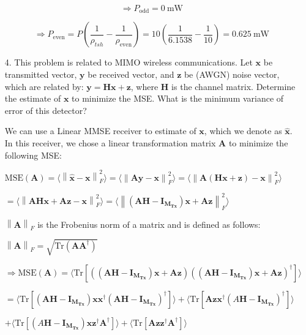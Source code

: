 \documentclass[fleqn]{article}
\newcommand{\norm}[1]{\left \lVert #1 \right \rVert}
\begin{document}
\begin{enumerate}
		\begin{equation*}
			\Rightarrow P_{\text{odd}} = 0\ \text{mW}
		\end{equation*}
		
		\begin{equation*}
			\Rightarrow P_{\text{even}} = P\left(\frac{1}{\rho_{tsh}} - \frac{1}{\rho_{\text{even}}}\right) = 10\left(\frac{1}{6.1538} - \frac{1}{10}\right) = 0.625\ \text{mW}
		\end{equation*}		
		
		\item[4.] This problem is related to MIMO wireless communications. Let $\mathbf{x}$ be transmitted vector, $\mathbf{y}$ be received vector, and $\mathbf{z}$ be (AWGN) noise vector, which are related by: $\mathbf{y}=\mathbf{Hx} + \mathbf{z}$, where $\mathbf{H}$ is the channel matrix. Determine the estimate of $\mathbf{x}$ to minimize the MSE. What is the minimum variance of error of this detector?
		
		\pagebreak
		We can use a Linear MMSE receiver to estimate of $\mathbf{x}$, which we denote as $\mathbf{\hat{x}}$. In this receiver, we chose a linear transformation matrix $\mathbf{A}$ to minimize the following MSE:
		
		$\text{MSE}(\mathbf{A}) = \langle \norm{\mathbf{\hat{x}} - \mathbf{x}}^2_F \rangle = \langle \norm{\mathbf{Ay} - \mathbf{x}}^2_F \rangle = \langle \norm{\mathbf{A}(\mathbf{Hx} + \mathbf{z}) - \mathbf{x}}^2_F \rangle$
		
		$ = \langle \norm{\mathbf{AHx} + \mathbf{Az} - \mathbf{x}}^2_F \rangle = \langle \norm{(\mathbf{AH} - \mathbf{I_{M_{Tx}}})\mathbf{x} + \mathbf{Az}}^2_F \rangle$
		
		$\norm{\mathbf{A}}_F$ is the Frobenius norm of a matrix and is defined as follows:
		
		$\norm{\mathbf{A}}_F = \sqrt{\text{Tr}(\mathbf{AA^{\dagger}})}$
		
		$\Rightarrow \text{MSE}(\mathbf{A}) = \langle \text{Tr}[((\mathbf{AH} - \mathbf{I_{M_{Tx}}})\mathbf{x} + \mathbf{Az})((\mathbf{AH} - \mathbf{I_{M_{Tx}}})\mathbf{x} + \mathbf{Az})^{\dagger}]\rangle$
		
		$ = \langle \text{Tr}[(\mathbf{AH} - \mathbf{I_{M_{Tx}}})\mathbf{xx^{\dagger}}(\mathbf{AH} - \mathbf{I_{M_{Tx}}})^{\dagger}] \rangle + \langle \text{Tr}[\mathbf{Azx^{\dagger}}(A\mathbf{H} - \mathbf{I_{M_{Tx}}})^{\dagger}] \rangle$
		
		$ + \langle \text{Tr}[(A\mathbf{H} - \mathbf{I_{M_{Tx}}})\mathbf{xz^{\dagger}A^{\dagger}}] \rangle + \langle \text{Tr}[\mathbf{Azz^{\dagger}A^{\dagger}}] \rangle$
		

\end{enumerate}
\end{document}

